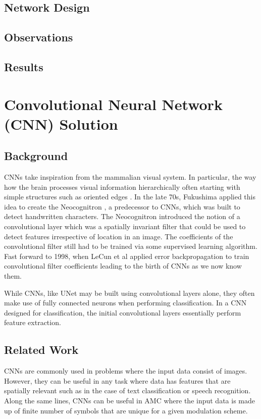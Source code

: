 \documentclass[journal,onecolumn]{IEEEtran}
\begin{document}
\subsection{Network Design}

\subsection{Observations}

\subsection{Results}

\section{Convolutional Neural Network (CNN) Solution}

\subsection{Background}

CNNs take inspiration from the mammalian visual system. In particular, the way how the brain processes visual information hierarchically often starting with simple structures such as oriented edges \cite{catEye}. In the late 70s, Fukushima applied this idea to create the Neocognitron \cite{neocognitron}, a predecessor to CNNs, which was built to detect handwritten characters. The Neocognitron introduced the notion of a convolutional layer which was a spatially invariant filter that could be used to detect features irrespective of location in an image. The coefficients of the convolutional filter still had to be trained via some supervised learning algorithm. Fast forward to 1998, when LeCun et al \cite{lenet5} applied error backpropagation to train convolutional filter coefficients leading to the birth of CNNs as we now know them.

While CNNs, like UNet \cite{unet} may be built using convolutional layers alone, they often make use of fully connected neurons when performing classification. In a CNN designed for classification, the initial convolutional layers essentially perform feature extraction.

\subsection{Related Work}

CNNs are commonly used in problems where the input data consist of images. However, they can be useful in any task where data has features that are spatially relevant such as in the case of text classification or speech recognition. Along the same lines, CNNs can be useful in AMC where the input data is made up of finite number of symbols that are unique for a given modulation scheme. 
\end{document}
